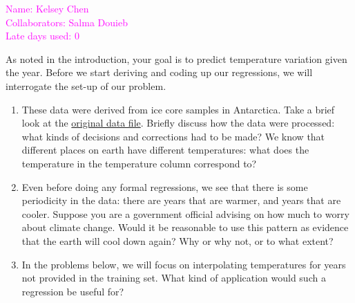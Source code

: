 \documentclass[submit]{harvardml}
\begin{document}
\noindent \textcolor{magenta}{Name: Kelsey Chen \\ Collaborators: Salma Douieb \\ Late days used: 0}

\newpage

\begin{problem}
As noted in the introduction, your goal is to predict temperature
variation given the year.  Before we start deriving and coding up our
regressions, we will interrogate the set-up of our problem.  

\begin{enumerate}
  \item These data were derived from ice core samples in Antarctica.
    Take a brief look at the
    \href{https://www.ncei.noaa.gov/pub/data/paleo/icecore/antarctica/epica_domec/edc3deuttemp2007.txt}{original
      data file}.  Briefly discuss how the data were processed: what kinds of
    decisions and corrections had to be made?  We know that different
    places on earth have different temperatures: what does the
    temperature in the temperature column correspond to?
        
  \item Even before doing any formal regressions, we see that there is
    some periodicity in the data: there are years that are warmer, and
    years that are cooler.  Suppose you are a government official
    advising on how much to worry about climate change.  Would it be
    reasonable to use this pattern as evidence that the earth will
    cool down again?  Why or why not, or to what extent?


  \item In the problems below, we will focus on interpolating
    temperatures for years not provided in the training set.  What
    kind of application would such a regression be useful for?

\end{enumerate}
  
\end{problem}
\end{document}
